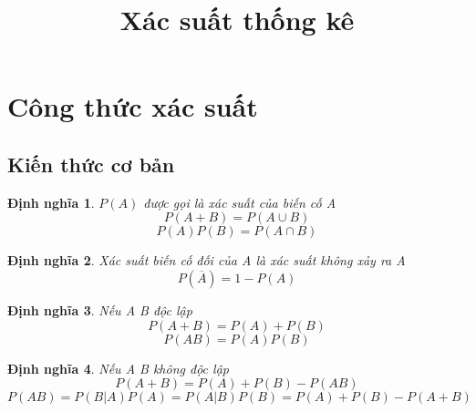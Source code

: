 \documentclass[12pt]{article}
\def\bar#1{\overline{#1}}
\newtheorem{thm}{Định nghĩa}
\begin{document}
\title{Xác suất thống kê}
\date{}
\maketitle

\section{Công thức xác suất}
\subsection{Kiến thức cơ bản}
\begin{thm}
$P(A)$ được gọi là xác suất của biến cố A
\begin{equation}
    P(A + B) = P( A \cup B)
\end{equation}
\begin{equation}
   P(A)P(B) = P(A \cap B) 
\end{equation}
\end{thm}

\begin{thm}
Xác suất biến cố đối của A là xác suất không xảy ra A
\begin{equation}
P(\bar{A}) = 1 - P(A)
\end{equation}
\end{thm}
\begin{thm}
Nếu A B độc lập
\begin{equation}
P(A + B) = P(A) + P(B) 
\end{equation}
\begin{equation}
    P(AB) = P(A)P(B)
\end{equation}
\end{thm}

\begin{thm}
Nếu A B không độc lập
\begin{equation}
P(A + B) = P(A) + P(B) - P(AB)
\end{equation}
\begin{equation}
    P(AB) = P(B|A)P(A) = P(A|B)P(B) = P(A) + P(B) - P(A + B)
\end{equation}
\end{thm}
\end{document}

